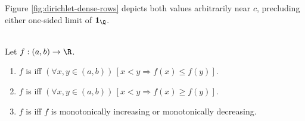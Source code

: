 \noindent Figure \ref{fig:dirichlet-dense-rows} depicts both values arbitrarily near $c$, precluding either one-sided limit of $\mathbf{1}_{\Q}$.

\begin{illustrationfigure}[H]
  
  \caption{For $g=\mathbf{1}_{\Q}$, rational inputs map to $1$ and irrational inputs to $0$ in every interval about $c$.}
  \label{fig:dirichlet-dense-rows}
\end{illustrationfigure}

\begin{definition} \label{def:monotone-real-function} \\
Let $f:(a,b)\to\R$.
\begin{enumerate}[label=(\roman*)]
\setlength{\itemsep}{0pt}
\item $f$ is  iff $(\forall x,y\in(a,b))\,[x<y\Rightarrow f(x)\leq f(y)]$.
\item $f$ is  iff $(\forall x,y\in(a,b))\,[x<y\Rightarrow f(x)\geq f(y)]$.
\item $f$ is  iff $f$ is monotonically increasing or monotonically decreasing.
\end{enumerate}
\end{definition}

